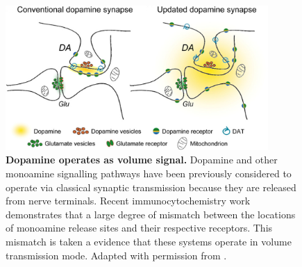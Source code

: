     \begin{figure}[!htb]
        \centering
        \includegraphics[width=10cm]{chapter1/figures/extrinsicVolTrans/extrinsicVolTrans.jpg}
        \caption[Volume transmission view of dopamine signalling]{\textbf{Dopamine operates as volume signal.} Dopamine and other monoamine signalling pathways have been previously considered to operate via classical synaptic transmission because they are released from nerve terminals. Recent immunocytochemistry work demonstrates that a large degree of mismatch between the locations of monoamine release sites and their respective receptors. This mismatch is taken a evidence that these systems operate in volume transmission mode. Adapted with permission from \cite{rice2008dopamine}.}
        \label{fig:introduction:extVolTrans}
    \end{figure}

    \label{sec:introduction:neuromodulators}
